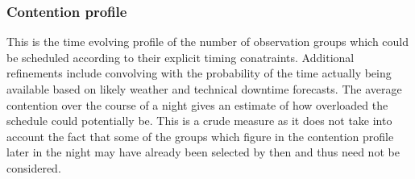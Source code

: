 \subsubsection{Contention profile}
This is the time evolving profile of the number of observation groups which could be scheduled according to their explicit timing conatraints. Additional refinements include convolving with the probability of the time actually being available based on likely weather and technical downtime forecasts. The average contention over the course of a night gives an estimate of how overloaded the schedule could potentially be. This is a crude measure as it does not take into account the fact that some of the groups which figure in the contention profile later in the night may have already been selected by then and thus need not be considered. 

